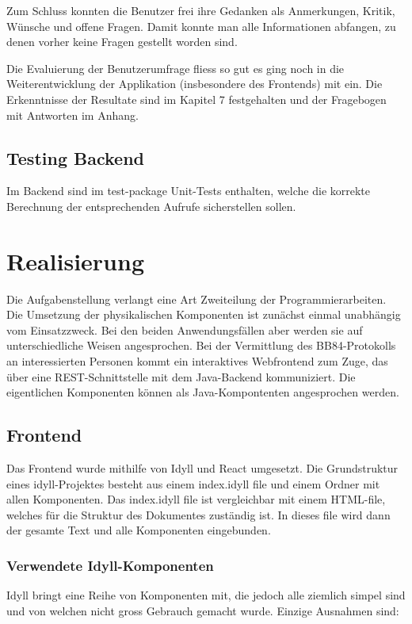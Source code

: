 \documentclass[a4paper,10.2pt,pdftex]{scrartcl}%
\begin{document}
Zum Schluss konnten die Benutzer frei ihre Gedanken als Anmerkungen, Kritik, Wünsche und offene Fragen. Damit konnte man alle Informationen abfangen, zu denen vorher keine Fragen gestellt worden sind.

Die Evaluierung der Benutzerumfrage fliess so gut es ging noch in die Weiterentwicklung der Applikation (insbesondere des Frontends) mit ein. Die Erkenntnisse der Resultate sind im Kapitel 7 festgehalten und der Fragebogen mit Antworten im Anhang.

\subsection{Testing Backend}
Im Backend sind im test-package Unit-Tests enthalten, welche die korrekte Berechnung der entsprechenden Aufrufe sicherstellen sollen. 


\section{Realisierung}
Die Aufgabenstellung verlangt eine Art Zweiteilung der Programmierarbeiten. Die Umsetzung der physikalischen Komponenten ist zunächst einmal unabhängig vom Einsatzzweck. Bei den beiden Anwendungsfällen aber werden sie auf unterschiedliche Weisen angesprochen. Bei der Vermittlung des BB84-Protokolls an interessierten Personen kommt ein interaktives Webfrontend zum Zuge, das über eine REST-Schnittstelle mit dem Java-Backend kommuniziert. Die eigentlichen Komponenten können als Java-Kompontenten angesprochen werden. 


\subsection{Frontend}
Das Frontend wurde mithilfe von Idyll und React umgesetzt. Die Grundstruktur eines idyll-Projektes besteht aus einem index.idyll file und einem Ordner mit allen Komponenten. Das index.idyll file ist vergleichbar mit einem HTML-file, welches für die Struktur des Dokumentes zuständig ist. In dieses file wird dann der gesamte Text und alle Komponenten eingebunden.
\subsubsection{Verwendete Idyll-Komponenten}
Idyll bringt eine Reihe von Komponenten mit, die jedoch alle ziemlich simpel sind und von welchen nicht gross Gebrauch gemacht wurde. Einzige Ausnahmen sind:
\end{document}
